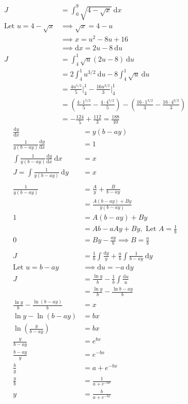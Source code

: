\documentclass[a4paper,11pt]{article}
\theoremstyle{plain}
\theoremstyle{definition}
\newcommand{\dx}{\text{d}}
\begin{document}
\begin{align*}
	J&=\int_0^9 \sqrt{4-\sqrt{x}}\ \text{d}x \\
	\text{Let } u = 4-\sqrt{x} &\implies \sqrt{x} =4-u \\
							   &\implies x = u^2-8u+16 \\
							   &\implies \text{d}x = 2u-8\ \text{d}u\\
	J&= \int_4^1 \sqrt{u}(2u-8)\ \text{d}u \\
	 &= 2\int_4^1 u^{3/2}\ \text{d}u - 8 \int_4^1 \sqrt{u} \ \text{d}u \\
	 &= \frac{4u^{5/2}}{5} \bigg|_4^1- \frac{16u^{3/2}}{3} \bigg|_4^1\\
	 &= \left(\frac{4\cdot 1^{5/2}}{5}-\frac{4\cdot 4^{5/2}}{5}\right)
	-\left(\frac{16\cdot 1^{3/2}}{3}-\frac{16\cdot 4^{3/2}}{3}\right)\\
	&= -\frac{124}{5} + \frac{112}{3} = \frac{188}{10}
\end{align*}
\begin{align*}
	\frac{\dx y}{\dx x} &= y(b-ay) \\
	\frac{1}{y(b-ay)}\frac{\dx y}{\dx x} &= 1 \\
	\int \frac{1}{y(b-ay)}\frac{\dx y}{\dx x}\ \dx x &= x \\
	J=\int \frac{1}{y(b-ay)}\ \dx y &= x \\
	\\
	\frac{1}{y(b-ay)} &= \frac{A}{y}+\frac{B}{b-ay} \\
					  &= \frac{A(b-ay)+By}{y(b-ay)}\\
					1 &= A(b-ay)+By \\
					  &= Ab - aAy+By, \text{ Let } A =\frac{1}{b} \\
					0 &= By-\frac{ay}{b} \implies B = \frac{a}{b} \\
	\\
	J&= \frac{1}{b}\int\frac{\dx y}{y}+\frac{a}{b}\int\frac{1}{b-ay}\ \dx y \\
	\text{Let } u = b-ay &\implies \dx u = -a\ \dx y \\
	J&= \frac{\ln y}{b}-\frac{1}{b}\int\frac{\dx u}{u} \\
	 &= \frac{\ln y}{b}-\frac{\ln b-ay}{b}\\
	\frac{\ln y}{b}-\frac{\ln( b-ay)}{b} &= x \\
	\ln y - \ln (b-ay) &= bx\\
	\ln {\left(\frac{y}{b-ay}\right)} &= bx \\
	\frac{y}{b-ay} &= e^{bx}\\
	\frac{b-ay}{y} &= e^{-bx}\\
	\frac{b}{y} &= a+e^{-bx}\\
	\frac{y}{b} &=\frac{1}{a+e^{-bx}}\\
	y &=\frac{b}{a+e^{-bx}}
\end{align*}
\end{document}
